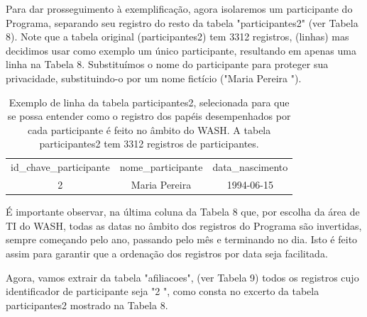 Para dar prosseguimento à exemplificação, agora isolaremos um participante do Programa, separando seu registro do resto da tabela "participantes2" (ver Tabela 8). Note que a tabela original (participantes2)  tem 3312 registros, (linhas) mas decidimos usar como exemplo um único participante, resultando em apenas uma linha na Tabela 8. Substituímos o nome do participante para proteger sua privacidade, substituindo-o por um nome fictício ("Maria Pereira ").





\begin{table}[htb]
\tiny
\caption{\label{96081f1bc28f7c738012f4beb3ef867b6b67107f}Exemplo de linha da tabela participantes2, selecionada para que se possa entender como o registro dos papéis desempenhados por cada participante é feito no âmbito do WASH. A tabela participantes2 tem 3312 registros de participantes.}

\centering
\begin{tabular}{|c|c|c|}
\hline
id\_chave\_participante  &  nome\_participante             &  data\_nascimento  \\
                     2  &  Maria Pereira  &  1994-06-15 \\
\hline
\end{tabular}
\end{table}


É importante observar, na última coluna da Tabela 8 que, por escolha da área de TI do WASH, todas as datas no âmbito dos registros do Programa são invertidas, sempre começando pelo ano, passando pelo mês e terminando no dia. Isto é feito assim para garantir que a ordenação dos registros por data seja facilitada.

Agora, vamos extrair da tabela "afiliacoes", (ver Tabela 9) todos os registros cujo identificador de participante seja "2 ", como consta no excerto da tabela participantes2 mostrado na Tabela 8.





